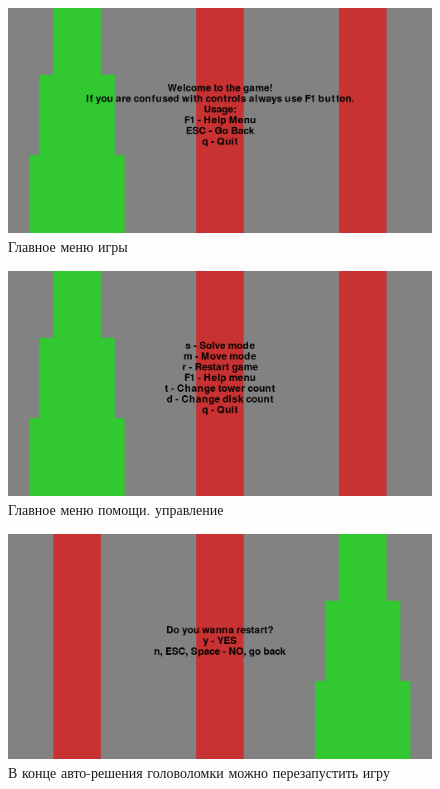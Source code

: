 \begin{figure}[H]
	\begin{center}
		\includegraphics[width=\textwidth]{images/main_menu.png}
		\caption{Главное меню игры}
	\end{center}
\end{figure}
\begin{figure}[H]
	\begin{center}
		\includegraphics[width=\textwidth]{images/main_help.png}
		\caption{Главное меню помощи. управление}
	\end{center}
\end{figure}
\begin{figure}[H]
	\begin{center}
		\includegraphics[width=\textwidth]{images/finish.png}
		\caption{В конце авто-решения головоломки можно перезапустить игру}
	\end{center}
\end{figure}
